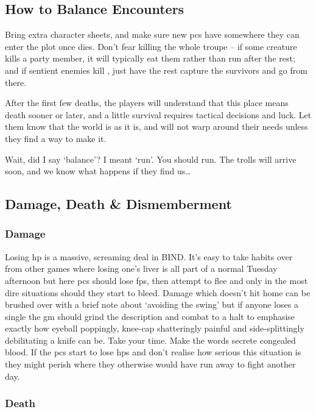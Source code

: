 \begin{multicols}{2}

\subsection{How to Balance Encounters}

Bring extra character sheets, and make sure new \glspl{pc} have somewhere they can enter the plot once  dies.
Don't fear killing the whole troupe -- if some creature kills a party member, it will typically eat them rather than run after the rest; and if sentient enemies kill , just have the rest capture the survivors and go from there.

After the first few deaths, the players will understand that this place means death sooner or later, and a little survival requires tactical decisions and luck.
Let them know that the world is as it is, and will not warp around their needs unless they find a way to make it.

Wait, did I say `balance'?
I meant `run'.
You should run.
The trolls will arrive soon, and we know what happens if they find us\ldots

\subsection{Damage, Death \& Dismemberment}

\subsubsection{Damage}

Losing \gls{hp} is a massive, screaming deal in BIND.
It's easy to take habits over from other games where losing one's liver is all part of a normal Tuesday afternoon but here \glspl{pc} should lose \glspl{fp}, then attempt to flee and only in the most dire situations should they start to bleed.
Damage which doesn't hit home can be brushed over with a brief note about `avoiding the swing' but if anyone loses a single  the \gls{gm} should grind the description and combat to a halt to emphasise exactly how eyeball poppingly, knee-cap shatteringly painful and side-splittingly debilitating a knife can be.
Take your time.
Make the words secrete congealed blood.
If the \glspl{pc} start to lose \glspl{hp} and don't realise how serious this situation is they might perish where they otherwise would have run away to fight another day.

\subsubsection{Death}
\label{pcdeath}


\end{multicols}
